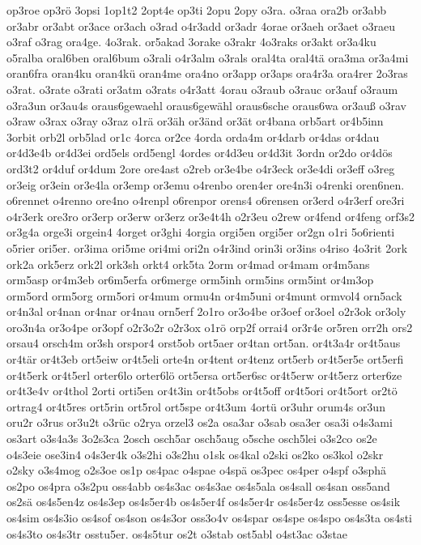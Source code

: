 {op3roe
op3rö
3opsi
1op1t2
2opt4e
op3ti
2opu
2opy
o3ra.
o3raa
ora2b
or3abb
or3abr
or3abt
or3ace
or3ach
o3rad
o4r3add
or3adr
4orae
or3aeh
or3aet
o3raeu
o3raf
o3rag
ora4ge.
4o3rak.
or5akad
3orake
o3rakr
4o3raks
or3akt
or3a4ku
o5ralba
oral6ben
oral6bum
o3rali
o4r3alm
o3rals
oral4ta
oral4tä
ora3ma
or3a4mi
oran6fra
oran4ku
oran4kü
oran4me
ora4no
or3app
or3aps
ora4r3a
ora4rer
2o3ras
o3rat.
o3rate
o3rati
or3atm
o3rats
o4r3att
4orau
o3raub
o3rauc
or3auf
o3raum
o3ra3un
or3au4s
oraus6gewaehl
oraus6gewähl
oraus6sche
oraus6wa
or3auß
o3rav
o3raw
o3rax
o3ray
o3raz
o1rä
or3äh
or3änd
or3ät
or4bana
orb5art
or4b5inn
3orbit
orb2l
orb5lad
or1c
4orca
or2ce
4orda
orda4m
or4darb
or4das
or4dau
or4d3e4b
or4d3ei
ord5els
ord5engl
4ordes
or4d3eu
or4d3it
3ordn
or2do
or4dös
ord3t2
or4duf
or4dum
2ore
ore4ast
o2reb
or3e4be
o4r3eck
or3e4di
or3eff
o3reg
or3eig
or3ein
or3e4la
or3emp
or3emu
o4renbo
oren4er
ore4n3i
o4renki
oren6nen.
o6rennet
o4renno
ore4no
o4renpl
o6renpor
orens4
o6rensen
or3erd
o4r3erf
ore3ri
o4r3erk
ore3ro
or3erp
or3erw
or3erz
or3e4t4h
o2r3eu
o2rew
or4fend
or4feng
orf3s2
or3g4a
orge3i
orgein4
4orget
or3ghi
4orgia
orgi5en
orgi5er
or2gn
o1ri
5o6rienti
o5rier
ori5er.
or3ima
ori5me
ori4mi
ori2n
o4r3ind
orin3i
or3ins
o4riso
4o3rit
2ork
ork2a
ork5erz
ork2l
ork3sh
orkt4
ork5ta
2orm
or4mad
or4mam
or4m5ans
orm5asp
or4m3eb
or6m5erfa
or6merge
orm5inh
orm5ins
orm5int
or4m3op
orm5ord
orm5org
orm5ori
or4mum
ormu4n
or4m5uni
or4munt
ormvol4
orn5ack
or4n3al
or4nan
or4nar
or4nau
orn5erf
2o1ro
or3o4be
or3oef
or3oel
o2r3ok
or3oly
oro3n4a
or3o4pe
or3opf
o2r3o2r
o2r3ox
o1rö
orp2f
orrai4
or3r4e
or5ren
orr2h
ors2
orsau4
orsch4m
or3sh
orspor4
orst5ob
ort5aer
or4tan
ort5an.
or4t3a4r
or4t5aus
or4tär
or4t3eb
ort5eiw
or4t5eli
orte4n
or4tent
or4tenz
ort5erb
or4t5er5e
ort5erfi
or4t5erk
or4t5erl
orter6lo
orter6lö
ort5ersa
ort5er6sc
or4t5erw
or4t5erz
orter6ze
or4t3e4v
or4thol
2orti
orti5en
or4t3in
or4t5obs
or4t5off
or4t5ori
or4t5ort
or2tö
ortrag4
or4t5res
ort5rin
ort5rol
ort5spe
or4t3um
4ortü
or3uhr
orum4s
or3un
oru2r
o3rus
or3u2t
o3rüc
o2rya
orzel3
os2a
osa3ar
o3sab
osa3er
osa3i
o4s3ami
os3art
o3s4a3s
3o2s3ca
2osch
osch5ar
osch5aug
o5sche
osch5lei
o3s2co
os2e
o4s3eie
ose3in4
o4s3er4k
o3s2hi
o3s2hu
o1sk
os4kal
o2ski
os2ko
os3kol
o2skr
o2sky
o3s4mog
o2s3oe
os1p
os4pac
o4spae
o4spä
os3pec
os4per
o4spf
o3sphä
os2po
os4pra
o3s2pu
oss4abb
os4s3ac
os4s3ae
os4s5ala
os4sall
os4san
oss5and
os2sä
os4s5en4z
os4s3ep
os4s5er4b
os4s5er4f
os4s5er4r
os4s5er4z
oss5esse
os4sik
os4sim
os4s3io
os4sof
os4son
os4s3or
oss3o4v
os4spar
os4spe
os4spo
os4s3ta
os4sti
os4s3to
os4s3tr
osstu5er.
os4s5tur
os2t
o3stab
ost5abl
o4st3ac
o3stae
}
